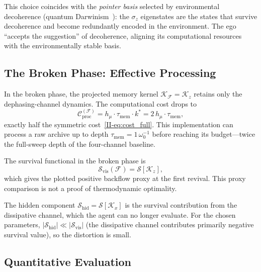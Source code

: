 \documentclass[12pt,a4paper,openany]{book}
\begin{document}
This choice coincides with the \emph{pointer basis}
selected by environmental decoherence (quantum
Darwinism~\cite{Zurek2009}): the $\sigma_z$ eigenstates
are the states that survive decoherence and become
redundantly encoded in the environment.
The ego ``accepts the suggestion'' of decoherence,
aligning its computational resources with the
environmentally stable basis.

\subsection{The Broken Phase: Effective Processing}
\label{II-subsec:broken}

In the broken phase, the projected memory kernel
$\mathcal{K}_{\mathcal{F}} = \mathcal{K}_z$ retains only
the dephasing-channel dynamics.
The computational cost drops to
\begin{equation}
\label{II-eq:cost_broken}
\mathcal{C}_{\mathrm{proc}}^{(\mathcal{F})}
= h_\mu \cdot \tau_{\mathrm{mem}} \cdot k^*
= 2\,h_\mu \cdot \tau_{\mathrm{mem}},
\end{equation}
exactly half the symmetric cost~\eqref{II-eq:cost_full}.
This implementation can process a raw archive up to depth
$\tau_{\mathrm{mem}} = 1\,\omega_0^{-1}$ before reaching
its budget---twice the full-sweep depth of the four-channel baseline.

The survival functional in the broken phase is
\begin{equation}
\label{II-eq:S_broken}
\mathcal{S}_{\mathrm{vis}}(\mathcal{F})
= \mathcal{S}[\mathcal{K}_z],
\end{equation}
which gives the plotted positive backflow proxy at the first revival.
This proxy comparison is not a proof of thermodynamic optimality.

The hidden component
$\mathcal{S}_{\mathrm{hid}} = \mathcal{S}[\mathcal{K}_x]$
is the survival contribution from the dissipative channel,
which the agent can no longer evaluate.
For the chosen parameters,
$|\mathcal{S}_{\mathrm{hid}}|
\ll |\mathcal{S}_{\mathrm{vis}}|$
(the dissipative channel contributes primarily negative
survival value), so the distortion is small.

\subsection{Quantitative Evaluation}
\label{II-subsec:quantitative}
\end{document}
